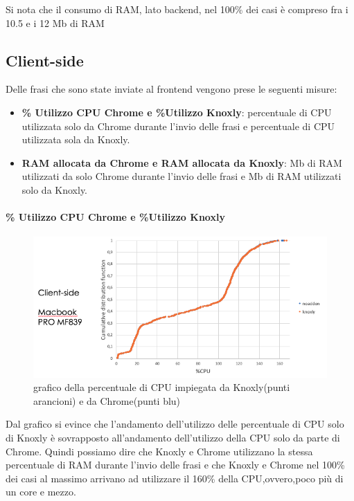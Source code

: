 Si nota che il consumo di RAM, lato backend, nel 100\% dei casi è compreso fra i 10.5 e i 12 Mb di RAM

\subsection{Client-side}
\label{sec:quantClient}
Delle frasi che sono state inviate al frontend vengono prese le seguenti misure:
\begin{itemize}
    \item \textbf{\% Utilizzo CPU Chrome e \%Utilizzo Knoxly}: percentuale di CPU utilizzata solo da Chrome durante l'invio delle frasi e percentuale di CPU utilizzata sola da Knoxly. 
    \item \textbf{RAM allocata da Chrome e RAM allocata da Knoxly}: Mb di RAM utilizzati da solo Chrome durante l'invio delle frasi e Mb di RAM utilizzati solo da Knoxly.
\end{itemize}

\paragraph{\% Utilizzo CPU Chrome e \%Utilizzo Knoxly}
\begin{figure}[h!t]
    \centering
    \includegraphics[width=15cm]{Figure/quantitativa/CPU-client.png}
    \caption{grafico della percentuale di CPU impiegata da Knoxly(punti arancioni) e da Chrome(punti blu)}
    \label{fig:clientCPU}
\end{figure}
\FloatBarrier

Dal grafico si evince che l'andamento dell'utilizzo delle percentuale di CPU solo di Knoxly è sovrapposto all'andamento dell'utilizzo della CPU solo da parte di Chrome. Quindi possiamo dire che Knoxly e Chrome utilizzano la stessa percentuale di RAM durante l'invio delle frasi e che Knoxly e Chrome nel 100\% dei casi al massimo arrivano ad utilizzare il 160\% della CPU,ovvero,poco più di un core e mezzo.

